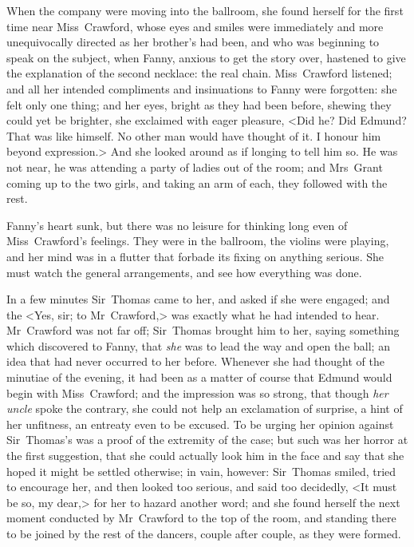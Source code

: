 When the company were moving into the ballroom, she found herself for the first time near Miss~Crawford, whose eyes and smiles were immediately and more unequivocally directed as her brother's had been, and who was beginning to speak on the subject, when Fanny, anxious to get the story over, hastened to give the explanation of the second necklace: the real chain. Miss~Crawford listened; and all her intended compliments and insinuations to Fanny were forgotten: she felt only one thing; and her eyes, bright as they had been before, shewing they could yet be brighter, she exclaimed with eager pleasure, <Did he? Did Edmund? That was like himself. No other man would have thought of it. I honour him beyond expression.> And she looked around as if longing to tell him so. He was not near, he was attending a party of ladies out of the room; and Mrs~Grant coming up to the two girls, and taking an arm of each, they followed with the rest.

Fanny's heart sunk, but there was no leisure for thinking long even of Miss~Crawford's feelings. They were in the ballroom, the violins were playing, and her mind was in a flutter that forbade its fixing on anything serious. She must watch the general arrangements, and see how everything was done.

In a few minutes Sir~Thomas came to her, and asked if she were engaged; and the <Yes, sir; to Mr~Crawford,> was exactly what he had intended to hear. Mr~Crawford was not far off; Sir~Thomas brought him to her, saying something which discovered to Fanny, that \textit{she}  was to lead the way and open the ball; an idea that had never occurred to her before. Whenever she had thought of the minutiae of the evening, it had been as a matter of course that Edmund would begin with Miss~Crawford; and the impression was so strong, that though \textit{her}  \textit{uncle}  spoke the contrary, she could not help an exclamation of surprise, a hint of her unfitness, an entreaty even to be excused. To be urging her opinion against Sir~Thomas's was a proof of the extremity of the case; but such was her horror at the first suggestion, that she could actually look him in the face and say that she hoped it might be settled otherwise; in vain, however: Sir~Thomas smiled, tried to encourage her, and then looked too serious, and said too decidedly, <It must be so, my dear,> for her to hazard another word; and she found herself the next moment conducted by Mr~Crawford to the top of the room, and standing there to be joined by the rest of the dancers, couple after couple, as they were formed.

